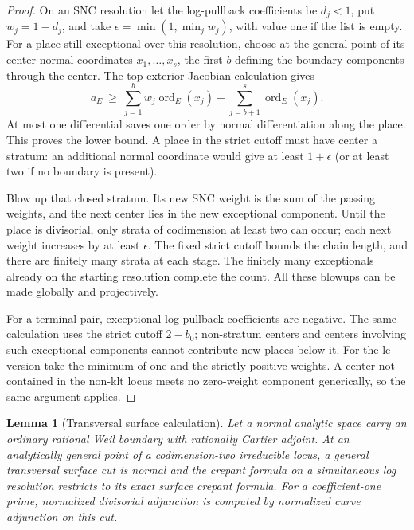 \documentclass[11pt,letterpaper]{article}
\DeclareMathOperator{\ord}{ord}
\newtheorem{lemma}[theorem]{Lemma}
\theoremstyle{definition}
\theoremstyle{remark}
\begin{document}
\begin{proof}
On an SNC resolution let the log-pullback coefficients be $d_j<1$,
put $w_j=1-d_j$, and take
$\epsilon=\min(1,\min_jw_j)$, with value one if the list is empty.
For a place still exceptional over this resolution, choose at the
general point of its center normal coordinates $x_1,\ldots,x_s$,
the first $b$ defining the boundary components through the center.
The top exterior Jacobian calculation gives
\begin{equation}
 a_E\ \geq\ \sum_{j=1}^{b}w_j\ord_E(x_j)
             +\sum_{j=b+1}^{s}\ord_E(x_j).
 \label{bir:jacobian-bound}
\end{equation}
At most one differential saves one order by normal differentiation
along the place.  This proves the lower bound.  A place in the
strict cutoff must have center a stratum: an additional normal
coordinate would give at least $1+\epsilon$ (or at least two if no
boundary is present).

Blow up that closed stratum.  Its new SNC weight is the sum of the
passing weights, and the next center lies in the new exceptional
component.  Until the place is divisorial, only strata of codimension
at least two can occur; each next weight increases by at least
$\epsilon$.  The fixed strict cutoff bounds the chain length, and
there are finitely many strata at each stage.  The finitely many
exceptionals already on the starting resolution complete the count.
All these blowups can be made globally and projectively.

For a terminal pair, exceptional log-pullback coefficients are
negative.  The same calculation uses the strict cutoff $2-b_0$;
non-stratum centers and centers involving such exceptional
components cannot contribute new places below it.  For the lc
version take the minimum of one and the strictly positive weights.
A center not contained in the non-klt locus meets no zero-weight
component generically, so the same argument applies.
\end{proof}

\begin{lemma}[Transversal surface calculation]
\label{bir:transversal}
Let a normal analytic space carry an ordinary rational Weil boundary
with rationally Cartier adjoint.  At an analytically general point
of a codimension-two irreducible locus, a general transversal surface
cut is normal and the crepant formula on a simultaneous log resolution
restricts to its exact surface crepant formula.  For a coefficient-one
prime, normalized divisorial adjunction is computed by normalized
curve adjunction on this cut.
\end{lemma}
\end{document}
